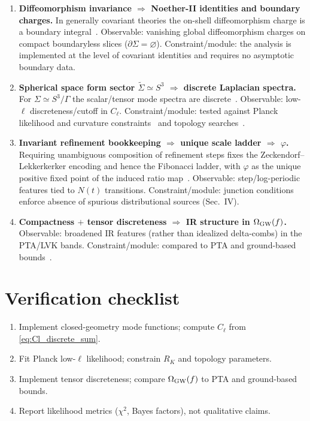 \documentclass[
  reprint,
  amsmath,amssymb,
  aps,
  prd,
  superscriptaddress,
  nofootinbib,
  longbibliography
]{revtex4-2}
\theoremstyle{definition}
\theoremstyle{remark}
\begin{document}
\begin{enumerate}
\item \textbf{Diffeomorphism invariance \(\Rightarrow\) Noether-II identities and boundary charges.}
In generally covariant theories the on-shell diffeomorphism charge is a boundary integral~\cite{Noether1918,IyerWald1994}.
Observable: vanishing global diffeomorphism charges on compact boundaryless slices (\(\partial\Sigma=\varnothing\)).
Constraint/module: the analysis is implemented at the level of covariant identities and requires no asymptotic boundary data.

\item \textbf{Spherical space form sector \(\widetilde\Sigma\simeq S^3\) \(\Rightarrow\) discrete Laplacian spectra.}
For \(\Sigma\simeq S^3/\Gamma\) the scalar/tensor mode spectra are discrete~\cite{WolfConstantCurvature,Scott3Manifolds}.
Observable: low-\(\ell\) discreteness/cutoff in \(C_\ell\).
Constraint/module: tested against Planck likelihood and curvature constraints~\cite{Planck2018Lik,Planck2018Cosmo} and topology searches~\cite{Planck2015Topology,Saha2024LensSpaces,FutureTopologySearches}.

\item \textbf{Invariant refinement bookkeeping \(\Rightarrow\) unique scale ladder \(\Rightarrow\) \(\varphi\).}
Requiring unambiguous composition of refinement steps fixes the Zeckendorf--Lekkerkerker encoding and hence the Fibonacci ladder, with \(\varphi\) as the unique positive fixed point of the induced ratio map~\cite{Lekkerkerker1951,Keller1972}.
Observable: step/log-periodic features tied to \(N(t)\) transitions.
Constraint/module: junction conditions enforce absence of spurious distributional sources (Sec.~IV).

\item \textbf{Compactness \(+\) tensor discreteness \(\Rightarrow\) IR structure in \(\Omega_{\rm GW}(f)\).}
Observable: broadened IR features (rather than idealized delta-combs) in the PTA/LVK bands.
Constraint/module: compared to PTA and ground-based bounds~\cite{NANOGrav15yr2023,IPTADR2_2022,LVK2021ISGWB}.
\end{enumerate}

\section{Verification checklist}
\begin{enumerate}
\item Implement closed-geometry mode functions; compute $C_\ell$ from \eqref{eq:Cl_discrete_sum}.
\item Fit Planck low-$\ell$ likelihood; constrain $R_K$ and topology parameters.
\item Implement tensor discreteness; compare $\Omega_{\rm GW}(f)$ to PTA and ground-based bounds.
\item Report likelihood metrics ($\chi^2$, Bayes factors), not qualitative claims.
\end{enumerate}
\end{document}

